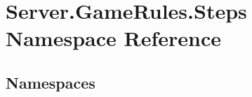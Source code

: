 \hypertarget{namespace_server_1_1_game_rules_1_1_steps}{}\section{Server.\+Game\+Rules.\+Steps Namespace Reference}
\label{namespace_server_1_1_game_rules_1_1_steps}
\subsection*{Namespaces}
\begin{DoxyCompactItemize}
\end{DoxyCompactItemize}

